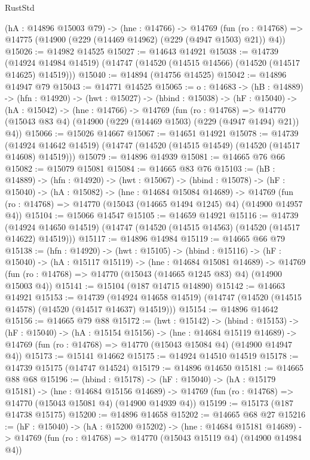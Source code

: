 \begin{lexlean}{RustStd}
\begin{coremodule}
  (hA : @14896 @15003 @79) ->
  (hne : @14766) ->
  @14769 (fun (ro : @14768) => @14775 (@14900 (@229 (@14469 @14962) (@229 (@4947 @1503) @21)) @4))
@15026 := @14982 @14525
@15027 := @14643 @14921
@15038 := @14739
    (@14924 @14984 @14519)
    (@14747 (@14520 (@14515 @14566) (@14520 (@14517 @14625) @14519)))
@15040 := @14894 (@14756 @14525)
@15042 := @14896 @14947 @79
@15043 := @14771 @14525
@15065 := {o : @14683} ->
  (hB : @14889) ->
  (hfn : @14920) ->
  (hwt : @15027) ->
  (hbind : @15038) ->
  (hF : @15040) ->
  (hA : @15042) ->
  (hne : @14766) ->
  @14769
    (fun (ro : @14768) =>
    @14770 (@15043 @83 @4) (@14900 (@229 (@14469 @1503) (@229 (@4947 @1494) @21)) @4))
@15066 := @15026 @14667
@15067 := @14651 @14921
@15078 := @14739
    (@14924 @14642 @14519)
    (@14747 (@14520 (@14515 @14549) (@14520 (@14517 @14608) @14519)))
@15079 := @14896 @14939
@15081 := @14665 @76 @66
@15082 := @15079 @15081
@15084 := @14665 @83 @76
@15103 := (hB : @14889) ->
  (hfn : @14920) ->
  (hwt : @15067) ->
  (hbind : @15078) ->
  (hF : @15040) ->
  (hA : @15082) ->
  (hne : @14684 @15084 @14689) ->
  @14769 (fun (ro : @14768) => @14770 (@15043 (@14665 @1494 @1245) @4) (@14900 @14957 @4))
@15104 := @15066 @14547
@15105 := @14659 @14921
@15116 := @14739
    (@14924 @14650 @14519)
    (@14747 (@14520 (@14515 @14563) (@14520 (@14517 @14622) @14519)))
@15117 := @14896 @14984
@15119 := @14665 @66 @79
@15138 := (hfn : @14920) ->
  (hwt : @15105) ->
  (hbind : @15116) ->
  (hF : @15040) ->
  (hA : @15117 @15119) ->
  (hne : @14684 @15081 @14689) ->
  @14769 (fun (ro : @14768) => @14770 (@15043 (@14665 @1245 @83) @4) (@14900 @15003 @4))
@15141 := @15104 (@187 @14715 @14890)
@15142 := @14663 @14921
@15153 := @14739
    (@14924 @14658 @14519)
    (@14747 (@14520 (@14515 @14578) (@14520 (@14517 @14637) @14519)))
@15154 := @14896 @14642
@15156 := @14665 @79 @88
@15172 := (hwt : @15142) ->
  (hbind : @15153) ->
  (hF : @15040) ->
  (hA : @15154 @15156) ->
  (hne : @14684 @15119 @14689) ->
  @14769 (fun (ro : @14768) => @14770 (@15043 @15084 @4) (@14900 @14947 @4))
@15173 := @15141 @14662
@15175 := @14924 @14510 @14519
@15178 := @14739 @15175 (@14747 @14524)
@15179 := @14896 @14650
@15181 := @14665 @88 @68
@15196 := (hbind : @15178) ->
  (hF : @15040) ->
  (hA : @15179 @15181) ->
  (hne : @14684 @15156 @14689) ->
  @14769 (fun (ro : @14768) => @14770 (@15043 @15081 @4) (@14900 @14939 @4))
@15199 := @15173 (@187 @14738 @15175)
@15200 := @14896 @14658
@15202 := @14665 @68 @27
@15216 := (hF : @15040) ->
  (hA : @15200 @15202) ->
  (hne : @14684 @15181 @14689) ->
  @14769 (fun (ro : @14768) => @14770 (@15043 @15119 @4) (@14900 @14984 @4))

\end{coremodule}
\end{lexlean}

